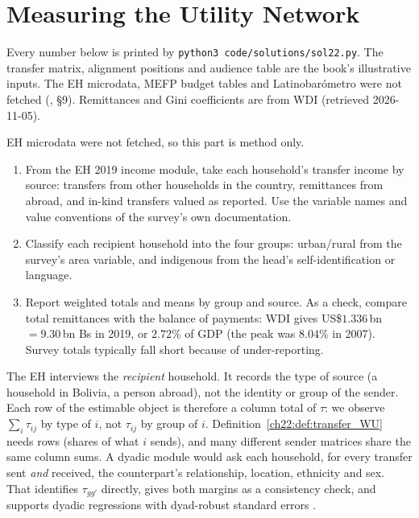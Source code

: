 \documentclass[../solutions_manual.tex]{subfiles}
\begin{document}
\ifSubfilesClassLoaded{\setcounter{chapter}{21}}{}%
\setcounter{chapter}{21}%
\chapter{Measuring the Utility Network}\label{sol22}

Every number below is printed by \texttt{python3 code/solutions/sol22.py}. The transfer matrix, alignment positions and audience table are the book's illustrative inputs. The EH microdata, MEFP budget tables and Latinobar\'ometro were not fetched (, \S9). Remittances and Gini coefficients are from WDI (retrieved 2026-11-05).


 EH microdata were not fetched, so this part is method only.
\begin{enumerate}
\item From the EH 2019 income module, take each household's transfer income by source: transfers from other households in the country, remittances from abroad, and in-kind transfers valued as reported. Use the variable names and value conventions of the survey's own documentation.
\item Classify each recipient household into the four groups: urban/rural from the survey's area variable, and indigenous from the head's self-identification or language.
\item Report weighted totals and means by group and source. As a check, compare total remittances with the balance of payments: WDI gives US\$$1.336$\,bn $= 9.30$\,bn Bs in 2019, or $2.72\%$ of GDP (the peak was $8.04\%$ in 2007). Survey totals typically fall short because of under-reporting.
\end{enumerate}

 The EH interviews the \emph{recipient} household. It records the type of source (a household in Bolivia, a person abroad), not the identity or group of the sender. Each row of the estimable object is therefore a column total of $\tau$: we observe $\sum_{i}\tau_{ij}$ by type of $i$, not $\tau_{ij}$ by group of $i$. Definition~\ref{ch22:def:transfer_WU} needs rows (shares of what $i$ sends), and many different sender matrices share the same column sums. A dyadic module would ask each household, for every transfer sent \emph{and} received, the counterpart's relationship, location, ethnicity and sex. That identifies $\tau_{gg'}$ directly, gives both margins as a consistency check, and supports dyadic regressions with dyad-robust standard errors \citep{fafchamps2007formation}.
\end{document}
